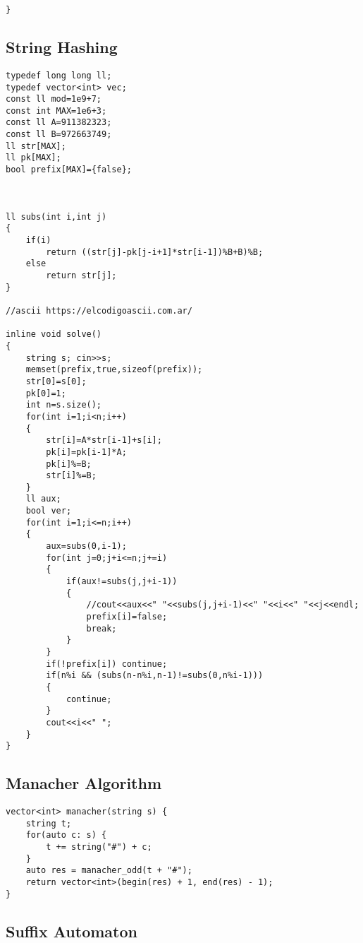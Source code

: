 \documentclass[10pt]{article}
\begin{document}
\begin{multicols*}{2}
\begin{lstlisting}[style=compactcpp]
}

\end{lstlisting}

\subsection{String Hashing}

\begin{lstlisting}[style=compactcpp]
typedef long long ll;
typedef vector<int> vec;
const ll mod=1e9+7;
const int MAX=1e6+3;
const ll A=911382323;
const ll B=972663749;
ll str[MAX];
ll pk[MAX];
bool prefix[MAX]={false};



ll subs(int i,int j)
{
    if(i)
        return ((str[j]-pk[j-i+1]*str[i-1])%B+B)%B;
    else
        return str[j];
}

//ascii https://elcodigoascii.com.ar/

inline void solve()
{
    string s; cin>>s;
    memset(prefix,true,sizeof(prefix));
    str[0]=s[0];
    pk[0]=1;
    int n=s.size();
    for(int i=1;i<n;i++)
    {
        str[i]=A*str[i-1]+s[i];
        pk[i]=pk[i-1]*A;
        pk[i]%=B;
        str[i]%=B;
    }
    ll aux;
    bool ver;
    for(int i=1;i<=n;i++)
    {
        aux=subs(0,i-1);
        for(int j=0;j+i<=n;j+=i)
        {
            if(aux!=subs(j,j+i-1))
            {
                //cout<<aux<<" "<<subs(j,j+i-1)<<" "<<i<<" "<<j<<endl;
                prefix[i]=false;
                break;
            }
        }
        if(!prefix[i]) continue;
        if(n%i && (subs(n-n%i,n-1)!=subs(0,n%i-1)))
        {
            continue;
        }
        cout<<i<<" ";
    }
}
\end{lstlisting}

\subsection{Manacher Algorithm}

\begin{lstlisting}[style=compactcpp]
vector<int> manacher(string s) {
    string t;
    for(auto c: s) {
        t += string("#") + c;
    }
    auto res = manacher_odd(t + "#");
    return vector<int>(begin(res) + 1, end(res) - 1);
}
\end{lstlisting}

\subsection{Suffix Automaton}


\end{multicols*}
\end{document}
